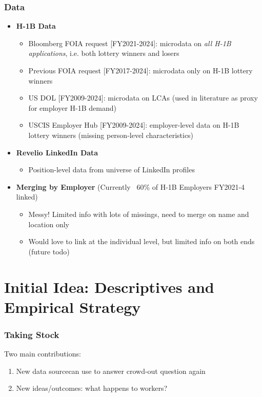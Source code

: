 \documentclass[xcolor=dvipsnames, compress, 12pt, aspectratio=169, handout]{beamer}
\begin{document}
\begin{frame}
    \frametitle{Data}
    \begin{itemize}
        \item \textbf{H-1B Data}
        \begin{itemize}
            \item Bloomberg FOIA request [FY2021-2024]: microdata on \textit{all H-1B applications}, i.e. both lottery winners and losers
            \item Previous FOIA request [FY2017-2024]: microdata only on H-1B lottery winners 
            \item US DOL [FY2009-2024]: microdata on LCAs (used in literature as proxy for employer H-1B demand)
            \item USCIS Employer Hub [FY2009-2024]: employer-level data on H-1B lottery winners (missing person-level characteristics)
        \end{itemize} 
        \item \textbf{Revelio LinkedIn Data}
        \begin{itemize}
            \item Position-level data from universe of LinkedIn profiles
        \end{itemize}
        \item \textbf{Merging by Employer} (Currently ~60\% of H-1B Employers FY2021-4 linked)
        \begin{itemize}
            \item Messy! Limited info with lots of missings, need to merge on name and location only
            \item Would love to link at the individual level, but limited info on both ends (future todo)
        \end{itemize}
    \end{itemize}
\end{frame}

\section{Initial Idea: Descriptives and Empirical Strategy}
\begin{frame}
    \frametitle{Taking Stock}
    Two main contributions:
    \begin{enumerate}
        \item New data source\textemdash can use to answer crowd-out question again
        \item New ideas/outcomes: what happens to workers?
    \end{enumerate}
\end{frame}
\end{document}
